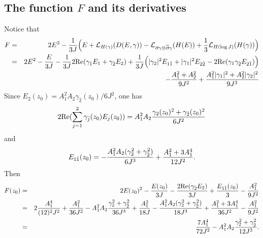\documentclass[12pt]{amsart}
\def\d{\partial}
\def\dbar{\overline{\partial}}
\def\d{\partial}
\def\cal{\mathcal}
\begin{document}
\subsection{The function $F$ and its derivatives}
 Notice that 
 \begin{eqnarray*}
F&=&2E^2- {1 \over 3 J} \Big( E +
{\cal L}_{H(\gamma)}(D(E, \gamma))-{\cal L}_{\d \gamma \otimes \dbar \gamma}(H(E))
+{1\over 3 }{\cal L}_{H(\log J)}(H(\gamma))\Big)\\
&=&2 E^2-{E\over 3 J} -{1\over 3J} 2\hbox{Re}( \gamma_{\bar1} E_1+\gamma_{\bar2} E_2)
+{1\over 3J}\Big(|\gamma_2|^2 E_{1\bar1}+|\gamma_1|^2 E_{2\bar2}-2\hbox{Re} (\gamma_1 \gamma_{\bar2} E_{2\bar1})\Big)\\
&&-{A_1^2 +A_2^2 \over 9 J^2} +{A_1^2 |\gamma_1|^2 +A_2^2 |\gamma_2|^2\over 9J^3}
\end{eqnarray*}
Since $E_2(z_0)=A_1^2 A_2 \gamma_{\bar2}(z_0) /6J^2$, one has
$$
2\hbox{Re}(\sum_{j=1}^2 \gamma_{\bar j}(z_0) E_j(z_0) )=A_1^2 A_2 {\gamma_2(z_0)^2+\gamma_{\bar2} (z_0)^2\over 6J^2}
$$
and 
$$
E_{1\bar1}(z_0)=-{A_1^2 A_2(\gamma_2^2+\gamma_{\bar2}^2)\over 6 J^3}+{A_1^2 +3A_1^4\over 12 J^2}.
$$
 Then
\begin{eqnarray*}
F(z_0)&=&2E(z_0)^2-{E(z_0)\over 3J}-{2\hbox{Re}(\gamma_{\bar2} E_2)\over 3J}+{E_{1\bar1}(z_0)\over 3}-{A_1^2 \over 9 J^2}\\
&=& 2{A_1^4 \over (12)^2J^2} +{A_1^2 \over 36 J^2} -A_1^2A_2 {\gamma_2^2+\gamma_{\bar2}^2\over 36J^3} +{A_1^2\over 18J}
-{A_1^2 A_2(\gamma_2^2+\gamma_{\bar2}^2)\over 18 J^3}+{A_1^2 +3A_1^4\over 36 J^2}-{A_1^2\over 9J^2}\\
&=& {7 A_1^4 \over 72 J^2}  -A_1^2A_2 {\gamma_2^2+\gamma_{\bar2}^2\over 12 J^3} .
\end{eqnarray*}
\end{document}
